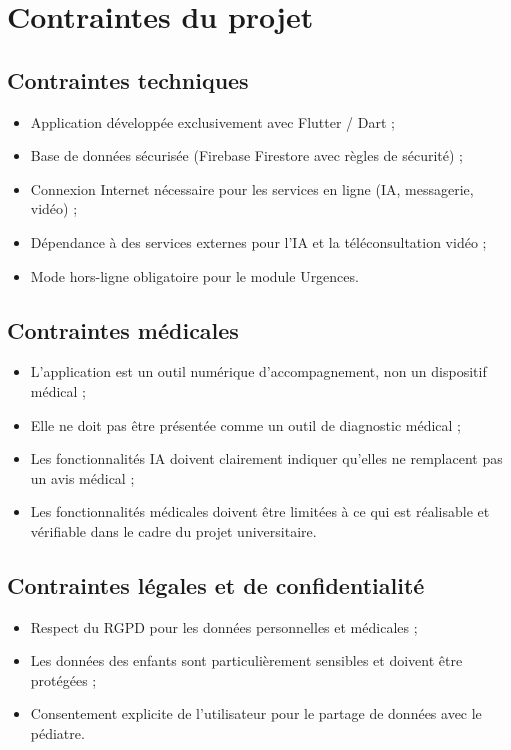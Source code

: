 \documentclass[11pt,a4paper]{article}
\begin{document}
\section{Contraintes du projet}

\subsection{Contraintes techniques}
\begin{itemize}
  \item Application développée exclusivement avec Flutter / Dart ;
  \item Base de données sécurisée (Firebase Firestore avec règles de sécurité) ;
  \item Connexion Internet nécessaire pour les services en ligne (IA, messagerie, vidéo) ;
  \item Dépendance à des services externes pour l'IA et la téléconsultation vidéo ;
  \item Mode hors-ligne obligatoire pour le module Urgences.
\end{itemize}

\subsection{Contraintes médicales}
\begin{itemize}
  \item L'application est un outil numérique d'accompagnement, non un dispositif médical ;
  \item Elle ne doit pas être présentée comme un outil de diagnostic médical ;
  \item Les fonctionnalités IA doivent clairement indiquer qu'elles ne remplacent pas un avis médical ;
  \item Les fonctionnalités médicales doivent être limitées à ce qui est réalisable et vérifiable dans le cadre du projet universitaire.
\end{itemize}

\subsection{Contraintes légales et de confidentialité}
\begin{itemize}
  \item Respect du RGPD pour les données personnelles et médicales ;
  \item Les données des enfants sont particulièrement sensibles et doivent être protégées ;
  \item Consentement explicite de l'utilisateur pour le partage de données avec le pédiatre.
\end{itemize}
\end{document}
